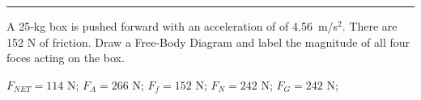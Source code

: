 \documentclass[12pt]{exam}
\begin{document}
\begin{questions}
\vs \hrule \vs


  A 25-kg box is pushed forward with an acceleration of of 4.56~m/s$^2$. There are 152 N of friction.  Draw a Free-Body Diagram and label the magnitude of all four foces acting on the box.

  \begin{solution}
    $F_{NET}=114$ N; $F_A=266$ N; $F_f=152$ N; $F_N=242$ N; $F_G=242$ N;
  \end{solution}

\vs


\end{questions}
\end{document}

